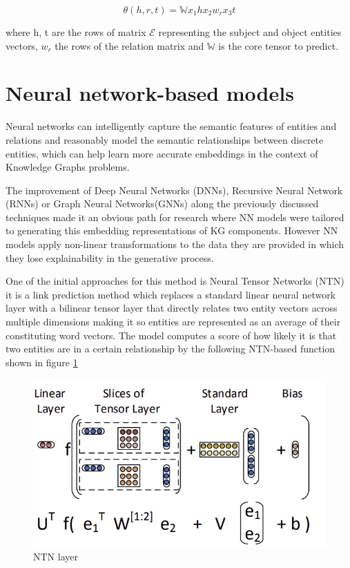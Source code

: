 \begin{equation}
    \label{eq:tucker_scoring}
    \theta (h, r, t) = \mathbb{W} x_1 h x_2 w_r x_3 t
\end{equation}

where h, t are the rows of matrix $\mathcal{E}$ representing the subject and object entities vectors, $w_r$ the rows of the relation matrix and $\mathbb{W}$ is the core tensor to predict.

\section{Neural network-based models}\label{sec:emb-nn}

Neural networks can intelligently capture the semantic features of entities and relations and reasonably model the semantic relationships between discrete entities, which can help learn more accurate embeddings in the context of Knowledge Graphs problems. 

The improvement of Deep Neural Networks (DNNs), Recursive Neural Network (RNNs) or Graph Neural Networks(GNNs) along the previously discussed techniques made it an obvious path for research where NN models were tailored to generating this embedding representations of KG components. However NN models apply non-linear transformations to the data they are provided in which they lose explainability in the generative process.

One of the initial approaches for this method is Neural Tensor Networks (NTN) \cite{} it is a link prediction method which replaces a standard linear neural network layer with a bilinear tensor layer that directly relates two entity vectors across multiple dimensions making it so entities are represented as an average of their constituting word vectors. The model computes a score of how likely it is that two entities are in a certain relationship by the following NTN-based function shown in figure \ref{fig:emb-ntn}

\begin{figure}[!ht]
    \centering
    \includegraphics[width=.65\textwidth]{fig/embeddings/NTN.png}
    \caption{NTN layer}
    \label{fig:emb-ntn}
\end{figure}

